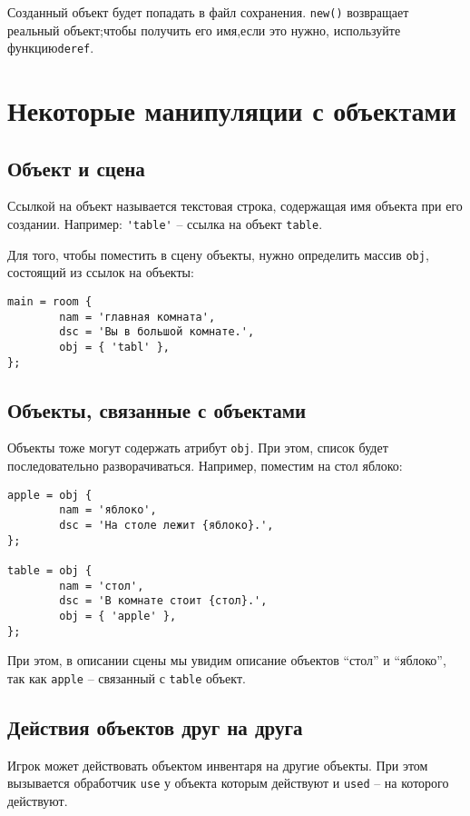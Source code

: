 \documentclass[a4paper,12pt]{article}
\begin{document}
Созданный объект будет попадать в файл сохранения. \verb/new()/ возвращает реальный объект;чтобы получить его имя,если это нужно, используйте функцию\verb/deref/.

\section{Некоторые манипуляции с объектами}

\subsection{Объект и сцена}

Ссылкой на объект называется текстовая строка, содержащая имя объекта при его создании. Например: \verb/'table'/ -- ссылка на объект \verb/table/.

Для того, чтобы поместить в сцену объекты, нужно определить массив \verb/obj/, состоящий из ссылок на объекты:

\begin{verbatim}
main = room {
        nam = 'главная комната',
        dsc = 'Вы в большой комнате.',
        obj = { 'tabl' },
};
\end{verbatim}

\subsection{Объекты, связанные с объектами}

Объекты тоже могут содержать атрибут \verb/obj/. При этом, список будет последовательно разворачиваться. Например, поместим на стол яблоко:

\begin{verbatim}
apple = obj {
        nam = 'яблоко',
        dsc = 'На столе лежит {яблоко}.',
};

table = obj {
        nam = 'стол',
        dsc = 'В комнате стоит {стол}.',
        obj = { 'apple' },
};
\end{verbatim}

При этом, в описании сцены мы увидим описание объектов ``стол'' и ``яблоко'', так как \verb/apple/ -- связанный с \verb/table/ объект.

\subsection{Действия объектов друг на друга}

Игрок может действовать объектом инвентаря на другие объекты. При этом вызывается обработчик \verb/use/ у объекта которым действуют и \verb/used/ -- на которого действуют.
\end{document}
